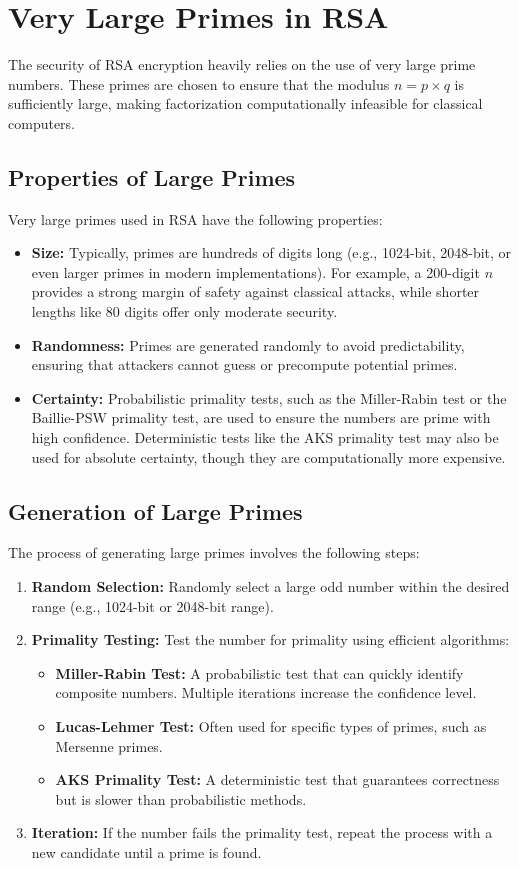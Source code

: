 \documentclass[12pt,a4paper]{report}
\begin{document}
\section{Very Large Primes in RSA}
The security of RSA encryption heavily relies on the use of very large prime numbers. These primes are chosen to ensure that the modulus \( n = p \times q \) is sufficiently large, making factorization computationally infeasible for classical computers.

\subsection{Properties of Large Primes}
Very large primes used in RSA have the following properties:
\begin{itemize}
    \item \textbf{Size:} Typically, primes are hundreds of digits long (e.g., 1024-bit, 2048-bit, or even larger primes in modern implementations). For example, a 200-digit \( n \) provides a strong margin of safety against classical attacks, while shorter lengths like 80 digits offer only moderate security.
    \item \textbf{Randomness:} Primes are generated randomly to avoid predictability, ensuring that attackers cannot guess or precompute potential primes.
    \item \textbf{Certainty:} Probabilistic primality tests, such as the Miller-Rabin test or the Baillie-PSW primality test, are used to ensure the numbers are prime with high confidence. Deterministic tests like the AKS primality test may also be used for absolute certainty, though they are computationally more expensive.
\end{itemize}

\subsection{Generation of Large Primes}
The process of generating large primes involves the following steps:
\begin{enumerate}
    \item \textbf{Random Selection:} Randomly select a large odd number within the desired range (e.g., 1024-bit or 2048-bit range).
    \item \textbf{Primality Testing:} Test the number for primality using efficient algorithms:
    \begin{itemize}
        \item \textbf{Miller-Rabin Test:} A probabilistic test that can quickly identify composite numbers. Multiple iterations increase the confidence level.
        \item \textbf{Lucas-Lehmer Test:} Often used for specific types of primes, such as Mersenne primes.
        \item \textbf{AKS Primality Test:} A deterministic test that guarantees correctness but is slower than probabilistic methods.
    \end{itemize}
    \item \textbf{Iteration:} If the number fails the primality test, repeat the process with a new candidate until a prime is found.
\end{enumerate}
\end{document}
